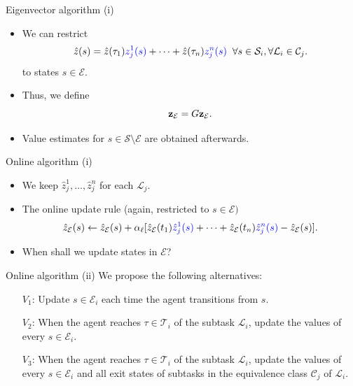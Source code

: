 \documentclass{beamer}
\theoremstyle{mystyle}
\newcommand{\cC}{\mathcal{C}}
\newcommand{\cE}{\mathcal{E}}
\newcommand{\cL}{\mathcal{L}}
\newcommand{\cS}{\mathcal{S}}
\newcommand{\cT}{\mathcal{T}}
\begin{document}
\begin{frame}{Eigenvector algorithm (i)}
    \begin{itemize}
        \item We can restrict
              \begin{equation*}
                  \hat{z}(s)=\hat{z}(\tau_1) {\color{blue} z_j^1(s)}+\cdots+\hat{z}(\tau_n){\color{blue}z_j^n(s)} \;\; \forall s\in\cS_i,\forall\cL_i\in\cC_j.
              \end{equation*}
              to states $s \in \cE$.
        \item Thus, we define
              \begin{equation*}\label{eq:exits}
                  {\bf z}_\cE=G{\bf z}_\cE.
              \end{equation*}
        \item Value estimates for $s \in \cS \setminus \cE$ are obtained afterwards.
    \end{itemize}

\end{frame}

\begin{frame}{Online algorithm (i)}

    \begin{itemize}

        \item We keep $\hat{z}_j^1,\ldots,\hat{z}_j^n$ for each $\cL_j$.
        \item The online update rule (again, restricted to $s \in \cE)$
              \[
                  \hat{z}_\cE(s) \leftarrow \hat{z}_\cE(s) + \alpha_\ell [\hat{z}_\cE(t_1) {\color{blue}\hat{z}_j^1(s)} + \cdots + \hat{z}_\cE(t_n) {\color{blue} \hat{z}_j^n(s)}  - \hat{z}_\cE(s)].
              \]
        \item When shall we update states in $\cE$?
    \end{itemize}

\end{frame}


\begin{frame}{Online algorithm (ii)}
    We propose the following alternatives:
    \begin{itemize}
        \item[$V_1$:] Update $s\in\cE_i$ each time the agent transitions from $s$.
        \item[$V_2$:] When the agent reaches $\tau \in \cT_i$ of the subtask $\cL_i$, update the values of every $s \in \cE_i$.
        \item[$V_3$:] When the agent reaches $\tau \in \cT_i$ of the subtask $\cL_i$, update the values of every $s \in \cE_i$ and all exit states of subtasks in the equivalence class $\cC_j$ of $\cL_i$.
    \end{itemize}



\end{frame}
\end{document}
